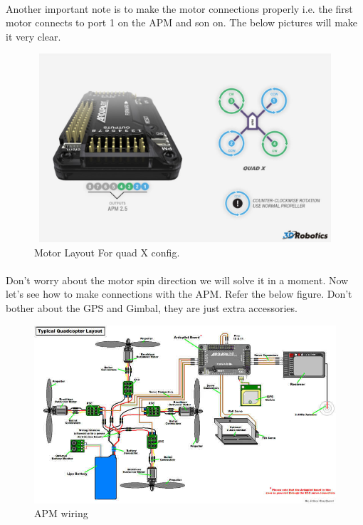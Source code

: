 \documentclass[11pt,a4paper]{article}
\begin{document}
		\paragraph{} Another important note is to make the motor connections properly i.e. the first motor connects to port 1 on the APM and son on. The below pictures will make it very clear.
		\begin{figure}[h]
	 	\centering
		\includegraphics[width=12cm,height=7cm]{direction}
		\caption{Motor Layout For quad X config.}
		\end{figure}
		\paragraph{}Don't worry about the motor spin direction we will solve it in a moment. Now let's see how to make connections with the APM. Refer the below figure. Don't bother about the GPS and Gimbal, they are just extra accessories.
		\begin{figure}[H]
    \begin{center}
    \includegraphics[scale=0.6]{APM}
    \caption{APM wiring}
    \label{fig: figure}
    \end{center}
\end{figure}
\end{document}
